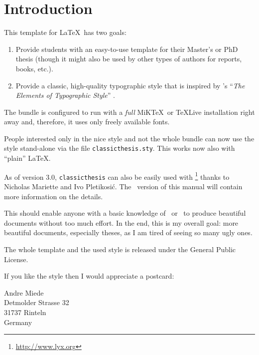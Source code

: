 
\chapter{Introduction} %

\label{ch:introduction} %


This template for \LaTeX\ has two goals:
\begin{enumerate}
\item Provide students with an easy-to-use template for their Master's or PhD thesis (though it might also be used by other types of authors for reports, books, etc.).
\item Provide a classic, high-quality typographic style that is inspired by \citeauthor{bringhurst:2002}'s ``\emph{The Elements of Typographic Style}'' \citep{bringhurst:2002}.
\marginpar{\myTitle \myVersion}
\end{enumerate}

The bundle is configured to run with a \emph{full} MiK\TeX\ or \TeX Live installation right away and, therefore, it uses only freely available fonts.

People interested only in the nice style and not the whole bundle can now use the style stand-alone via the file \texttt{classicthesis.sty}. This works now also with ``plain'' \LaTeX.

As of version 3.0, \texttt{classicthesis} can also be easily used with \mLyX\footnote{\url{http://www.lyx.org}} thanks to Nicholas Mariette and Ivo Pletikosi\'c. The \mLyX\ version of this manual will contain more information on the details.

This should enable anyone with a basic knowledge of \LaTeXe\ or \mLyX\ to produce beautiful documents without too much effort. In the end, this is my overall goal: more beautiful documents, especially theses, as I am tired of seeing so many ugly ones.

The whole template and the used style is released under the  General Public License. 

If you like the style then I would appreciate a postcard:
\begin{center}
Andre Miede \\
Detmolder Strasse 32 \\
31737 Rinteln \\
Germany
\end{center}

